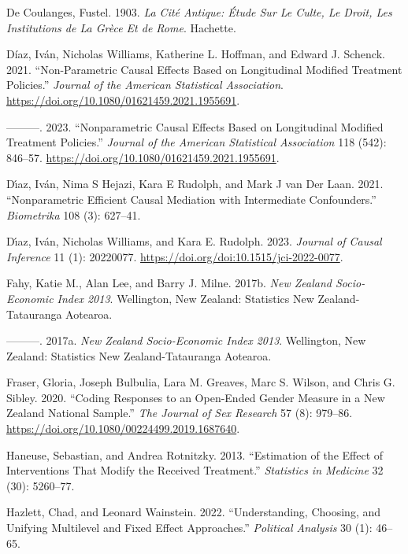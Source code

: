 \documentclass[
  single column]{article}
\newlength{\cslhangindent}
\newenvironment{CSLReferences}[2] %
 {\begin{list}{}{%
  \setlength{\itemindent}{0pt}
  \setlength{\leftmargin}{0pt}
  \setlength{\parsep}{0pt}
  \ifodd #1
   \setlength{\leftmargin}{\cslhangindent}
   \setlength{\itemindent}{-1\cslhangindent}
  \fi
  \setlength{\itemsep}{#2\baselineskip}}}
 {\end{list}}
\begin{document}
\begin{CSLReferences}{1}{0}
De Coulanges, Fustel. 1903. \emph{La Cité Antique: Étude Sur Le Culte,
Le Droit, Les Institutions de La Grèce Et de Rome}. Hachette.

Díaz, Iván, Nicholas Williams, Katherine L. Hoffman, and Edward J.
Schenck. 2021. {``Non-Parametric Causal Effects Based on Longitudinal
Modified Treatment Policies.''} \emph{Journal of the American
Statistical Association}.
\url{https://doi.org/10.1080/01621459.2021.1955691}.

---------. 2023. {``Nonparametric Causal Effects Based on Longitudinal
Modified Treatment Policies.''} \emph{Journal of the American
Statistical Association} 118 (542): 846--57.
\url{https://doi.org/10.1080/01621459.2021.1955691}.

Dı́az, Iván, Nima S Hejazi, Kara E Rudolph, and Mark J van Der Laan.
2021. {``Nonparametric Efficient Causal Mediation with Intermediate
Confounders.''} \emph{Biometrika} 108 (3): 627--41.

Dı́az, Iván, Nicholas Williams, and Kara E. Rudolph. 2023. \emph{Journal
of Causal Inference} 11 (1): 20220077.
\url{https://doi.org/doi:10.1515/jci-2022-0077}.

Fahy, Katie M., Alan Lee, and Barry J. Milne. 2017b. \emph{New Zealand
Socio-Economic Index 2013}. Wellington, New Zealand: Statistics New
Zealand-Tatauranga Aotearoa.

---------. 2017a. \emph{New Zealand Socio-Economic Index 2013}.
Wellington, New Zealand: Statistics New Zealand-Tatauranga Aotearoa.

Fraser, Gloria, Joseph Bulbulia, Lara M. Greaves, Marc S. Wilson, and
Chris G. Sibley. 2020. {``Coding Responses to an Open-Ended Gender
Measure in a {N}ew {Z}ealand National Sample.''} \emph{The Journal of
Sex Research} 57 (8): 979--86.
\url{https://doi.org/10.1080/00224499.2019.1687640}.

Haneuse, Sebastian, and Andrea Rotnitzky. 2013. {``Estimation of the
Effect of Interventions That Modify the Received Treatment.''}
\emph{Statistics in Medicine} 32 (30): 5260--77.

Hazlett, Chad, and Leonard Wainstein. 2022. {``Understanding, Choosing,
and Unifying Multilevel and Fixed Effect Approaches.''} \emph{Political
Analysis} 30 (1): 46--65.


\end{CSLReferences}
\end{document}
